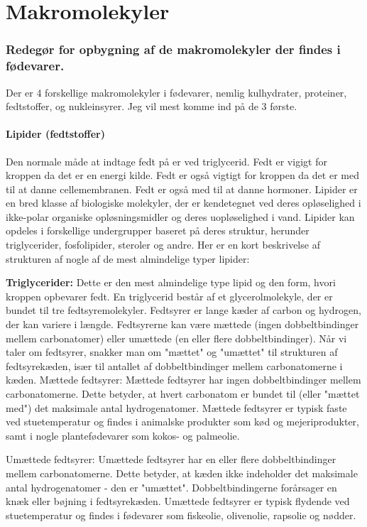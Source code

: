 \newpage
\part{Makromolekyler}
    \section{Redegør for opbygning af de makromolekyler der findes i fødevarer.}
        Der er 4 forskellige makromolekyler i fødevarer, nemlig kulhydrater, proteiner, fedtstoffer, og nukleinsyrer. Jeg vil mest komme ind på de 3 første. 
        \subsection*{Lipider (fedtstoffer)}
           Den normale måde at indtage fedt på er ved triglycerid. Fedt er vigigt for kroppen da det er en energi kilde. Fedt er også vigtigt for kroppen da det er med til at danne cellemembranen. Fedt er også med til at danne hormoner.
           Lipider er en bred klasse af biologiske molekyler, der er kendetegnet ved deres opløselighed i ikke-polar organiske opløsningsmidler og deres uopløselighed i vand. Lipider kan opdeles i forskellige undergrupper baseret på deres struktur, herunder triglycerider, fosfolipider, steroler og andre. Her er en kort beskrivelse af strukturen af nogle af de mest almindelige typer lipider:

           \textbf{Triglycerider:} Dette er den mest almindelige type lipid og den form, hvori kroppen opbevarer fedt. En triglycerid består af et glycerolmolekyle, der er bundet til tre fedtsyremolekyler. Fedtsyrer er lange kæder af carbon og hydrogen, der kan variere i længde. Fedtsyrerne kan være mættede (ingen dobbeltbindinger mellem carbonatomer) eller umættede (en eller flere dobbeltbindinger). Når vi taler om fedtsyrer, snakker man om "mættet" og "umættet" til strukturen af fedtsyrekæden, især til antallet af dobbeltbindinger mellem carbonatomerne i kæden.
           Mættede fedtsyrer: Mættede fedtsyrer har ingen dobbeltbindinger mellem carbonatomerne. Dette betyder, at hvert carbonatom er bundet til (eller "mættet med") det maksimale antal hydrogenatomer. Mættede fedtsyrer er typisk faste ved stuetemperatur og findes i animalske produkter som kød og mejeriprodukter, samt i nogle plantefødevarer som kokos- og palmeolie.
           
           Umættede fedtsyrer: Umættede fedtsyrer har en eller flere dobbeltbindinger mellem carbonatomerne. Dette betyder, at kæden ikke indeholder det maksimale antal hydrogenatomer - den er "umættet". Dobbeltbindingerne forårsager en knæk eller bøjning i fedtsyrekæden. Umættede fedtsyrer er typisk flydende ved stuetemperatur og findes i fødevarer som fiskeolie, olivenolie, rapsolie og nødder.
           
